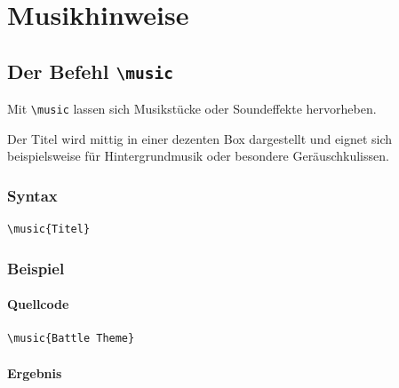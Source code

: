 \section{Musikhinweise}

\subsection{Der Befehl \texttt{\textbackslash music}}

Mit \verb|\music| lassen sich Musikstücke oder Soundeffekte hervorheben.

Der Titel wird mittig in einer dezenten Box dargestellt und eignet sich beispielsweise für Hintergrundmusik oder besondere Geräuschkulissen.

\subsubsection*{Syntax}

\begin{Verbatim}
\music{Titel}
\end{Verbatim}

\subsubsection*{Beispiel}

\paragraph{Quellcode}

\begin{Verbatim}
\music{Battle Theme}
\end{Verbatim}

\paragraph{Ergebnis}

